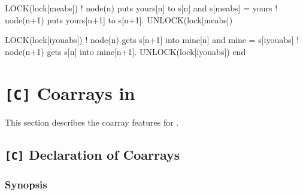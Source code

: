 \begin{itemize}
\begin{XFexample}
      LOCK(lock[meabs])   ! node(n) puts yours[n] to s[n] and 
      s[meabs] = yours    ! node(n+1) puts yours[n+1] to s[n+1].
      UNLOCK(lock[meabs])

      LOCK(lock[iyouabs])  ! node(n) gets s[n+1] into mine[n] and 
      mine = s[iyouabs]    ! node(n+1) gets s[n] into mine[n+1].
      UNLOCK(lock[iyouabs])
      end
\end{XFexample}

\end{itemize}

%
%
%

\section{{\tt [C]} Coarrays in {\XMPC}}
\label{154737_16Jan17}

This section describes the coarray features for {\XMPC}.

\subsection{{\tt [C]} Declaration of Coarrays}
\label{173311_31Oct14}

\subsubsection*{Synopsis}


